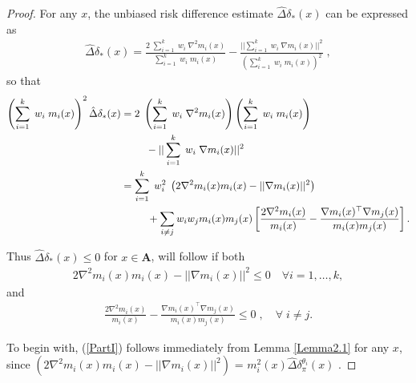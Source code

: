 \documentclass[11pt]{article}
\theoremstyle{definition}
\begin{document}
\begin{proof}
For any $x$, the unbiased risk difference estimate $\hat{\Delta}\delta_*(x)$ can be expressed as
\begin{align}
  \hat{\Delta}\delta_*(x) = \frac{2\;\sum\limits_{i=1}^{k}\;w_i\;\nabla^2 m_i(x)}{\sum\limits_{i=1}^{k}\;w_i\;m_i(x)} - \frac{||\sum\limits_{i=1}^{k}\;w_i\;\nabla m_i(x)||^2}{\left(\sum\limits_{i=1}^{k}\;w_i\;m_i(x)\right)^2}\; ,
  \label{Ddelta*}
\end{align}
so that
\begin{align}
   \nonumber  \left(\sum\limits_{i=1}^{k}\;w_i\;m_i(x)\right)^2 \hat{\Delta}\delta_*(x)  & = 2\;\left(\sum\limits_{i=1}^{k}\;w_i\;\nabla^2 m_i(x) \right)\left(\sum\limits_{i=1}^{k}\;w_i\;m_i(x)\right) \\
  \nonumber  & \quad \hspace{5mm} - ||\sum\limits_{i=1}^{k}\;w_i\;\nabla m_i(x)||^2 \\
    \nonumber & = \sum\limits_{i=1}^{k}\;w_i^2\;\left(2\nabla^2 m_i(x) m_i(x) - ||\nabla m_i(x)||^2\right) \\
  &  \hspace{9mm} + \sum\limits_{i\neq j} w_i w_j m_i(x) m_j(x) \left[\frac{2\nabla^2 m_i(x)}{m_i(x)} - \frac{\nabla m_i(x)^{\top}\nabla m_j(x)}{m_i(x) m_j(x)}\right].
   \label{eqIandII}
\end{align}

Thus $\hat{\Delta}\delta_*(x) \le 0$  for $x \in \textbf{A}$, will follow if both\\
\begin{align} 
2\nabla^2 m_i(x) m_i(x) - ||\nabla m_i(x)||^2 \leq 0 \quad \forall i= 1,\ldots,k,
\label{PartI}
\end{align}
and
\begin{align} 
 \frac{2\nabla^2 m_i(x)}{m_i(x)} - \frac{\nabla m_i(x)^{\top}\nabla m_j(x)}{m_i(x) m_j(x)} \leq 0 \; , \quad \forall \;i\neq j.
 \label{PartII}
\end{align}

To begin with, (\ref{PartI}) follows immediately from Lemma \ref{Lemma2.1} for any $x$, since   $(2\nabla^2 m_i(x) m_i(x) - ||\nabla m_i(x)||^2)$ = $m_i^2(x) \hat{\Delta}\delta_\pi^{\theta_i}(x)$ .


\end{proof}
\end{document}

